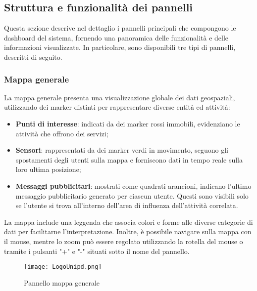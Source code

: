 \documentclass[10pt]{article}
\begin{document}
\begin{justify}
\subsection{Struttura e funzionalità dei pannelli}
Questa sezione descrive nel dettaglio i pannelli principali che compongono le dashboard del sistema, fornendo una panoramica delle funzionalità e delle informazioni visualizzate. In particolare, sono disponibili tre tipi di pannelli, descritti di seguito.

    \subsubsection{Mappa generale}
    La mappa generale presenta una visualizzazione globale dei dati geospaziali, utilizzando dei marker distinti per rappresentare diverse entità ed attività:
    \begin{itemize}
        \item \textbf{Punti di interesse}: indicati da dei marker rossi immobili, evidenziano le attività che offrono dei servizi;
        \item \textbf{Sensori}: rappresentati da dei marker verdi in movimento, seguono gli spostamenti degli utenti sulla mappa e forniscono dati in tempo reale sulla loro ultima posizione;
        \item \textbf{Messaggi pubblicitari}: mostrati come quadrati arancioni, indicano l'ultimo messaggio pubblicitario generato per ciascun utente. Questi sono visibili solo se l'utente si trova all'interno dell'area di influenza dell'attività correlata.
    \end{itemize}
    La mappa include una leggenda che associa colori e forme alle diverse categorie di dati per facilitarne l'interpretazione. Inoltre, è possibile navigare sulla mappa con il mouse, mentre lo zoom può essere regolato utilizzando la rotella del mouse o tramite i pulsanti "+" e "-" situati sotto il nome del pannello.
    \begin{figure}[H]
    \centering
    \texttt{[image: LogoUnipd.png]}
    \caption{Pannello mappa generale}
    \end{figure}


\end{justify}
\end{document}

